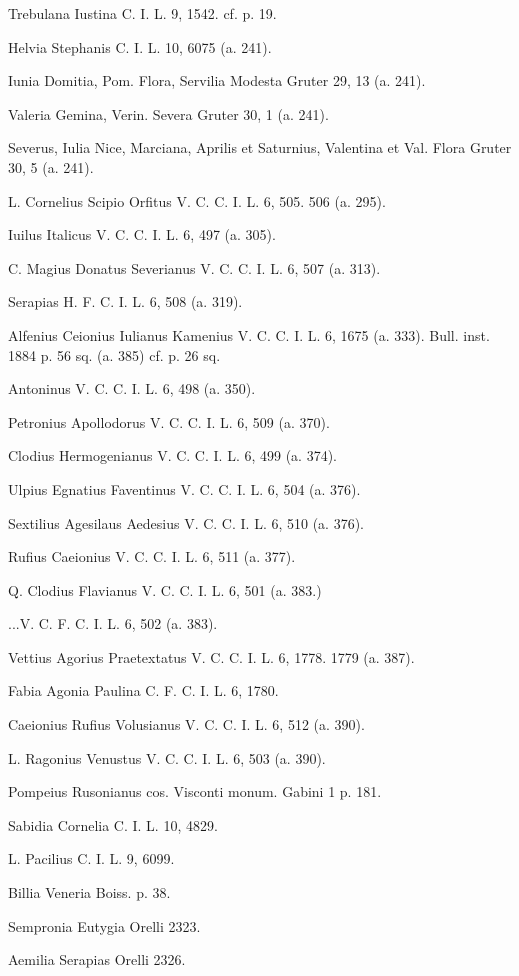 \documentclass[a4paper, 11pt, oneside, polutonikogreek, german, twocolumn]{article}
\begin{document}
Trebulana Iustina C. I. L. 9, 1542. cf. p. 19.

Helvia Stephanis C. I. L. 10, 6075 (a. 241).

Iunia Domitia, Pom. Flora, Servilia Modesta Gruter 29, 13 (a. 241).

Valeria Gemina, Verin. Severa Gruter 30, 1 (a. 241).

Severus, Iulia Nice, Marciana, Aprilis et Saturnius, Valentina et Val. Flora Gruter 30, 5 (a. 241).

L. Cornelius Scipio Orfitus V. C. C. I. L. 6, 505. 506 (a. 295).

Iuilus Italicus V. C. C. I. L. 6, 497 (a. 305).

C. Magius Donatus Severianus V. C. C. I. L. 6, 507 (a. 313).

Serapias H. F. C. I. L. 6, 508 (a. 319).

Alfenius Ceionius Iulianus Kamenius V. C. C. I. L. 6, 1675 (a. 333). Bull. inst. 1884 p. 56 sq. (a. 385) cf. p. 26 sq.

Antoninus V. C. C. I. L. 6, 498 (a. 350).

Petronius Apollodorus V. C. C. I. L. 6, 509 (a. 370).

Clodius Hermogenianus V. C. C. I. L. 6, 499 (a. 374).

Ulpius Egnatius Faventinus V. C. C. I. L. 6, 504 (a. 376).

Sextilius Agesilaus Aedesius V. C. C. I. L. 6, 510 (a. 376).

Rufius Caeionius V. C. C. I. L. 6, 511 (a. 377).

Q. Clodius Flavianus V. C. C. I. L. 6, 501 (a. 383.)

...V. C. F. C. I. L. 6, 502 (a. 383).

Vettius Agorius Praetextatus V. C. C. I. L. 6, 1778. 1779 (a. 387).

Fabia Agonia Paulina C. F. C. I. L. 6, 1780.

Caeionius Rufius Volusianus V. C. C. I. L. 6, 512 (a. 390).

L. Ragonius Venustus V. C. C. I. L. 6, 503 (a. 390).

Pompeius Rusonianus cos. Visconti monum. Gabini 1 p. 181.

Sabidia Cornelia C. I. L. 10, 4829.

L. Pacilius C. I. L. 9, 6099.

Billia Veneria Boiss. p. 38.

Sempronia Eutygia Orelli 2323.

Aemilia Serapias Orelli 2326.
\end{document}
